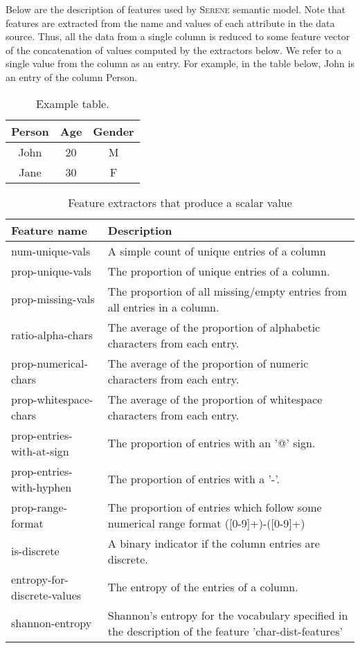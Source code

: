 \documentclass[letterpaper]{article} %
\newcommand{\serene}{\textsc{Serene}}
\begin{document}
Below are the description of features used by \serene{} semantic model.
Note that features are extracted from the name and values of each attribute in the data source.
Thus, all the data from a single column is reduced to some feature
vector of the concatenation of values computed by the extractors below.
We refer to a single value from the column as an entry. For example, in the table below, John is an entry of the column Person.

\begin{table}[!ht]\small
  \centering
  \caption{Example table.}
  	\begin{tabular}{ccc} 
  		\hline
		Person & Age & Gender \\
  		\hline
	    John & 20 & M\\
    	Jane & 30 & F\\
  		\hline
		\end{tabular} 
\vspace*{-3mm}
\end{table}


\begin{table}[h]
	\centering
	\caption{Feature extractors that produce a scalar value}
	\begin{tabular}{p{3cm}p{4.5cm}}
	Feature name & Description \\ \hline
	num-unique-vals & A simple count of unique entries of a column\\
	\rowcolor{Gray}
	prop-unique-vals & The proportion of unique entries of a column. \\
	\rowcolor{Gray}
	prop-missing-vals & The proportion of all missing/empty entries from all entries in a column.\\
	ratio-alpha-chars & The average of the proportion of alphabetic characters from each entry.\\
	\rowcolor{Gray}
	prop-numerical-chars & The average of the proportion of numeric characters from each entry.\\
	prop-whitespace-chars    & The average of the proportion of whitespace characters from each entry.\\
	\rowcolor{Gray}
	prop-entries-with-at-sign& The proportion of entries with an '@' sign. \\
	prop-entries-with-hyphen & The proportion of entries with a '-'. \\
	\rowcolor{Gray}
	prop-range-format        & The proportion of entries which follow some numerical range format   ([0-9]+)-([0-9]+) \\
	is-discrete              & A binary indicator if the column entries are discrete. \\
	\rowcolor{Gray}
	entropy-for-discrete-values & The entropy of the entries of a column.\\
	shannon-entropy          & Shannon's entropy for the vocabulary specified in the description of the feature 'char-dist-features'\\
	\end{tabular}
	\vspace*{-3mm}
\end{table}
\end{document}
